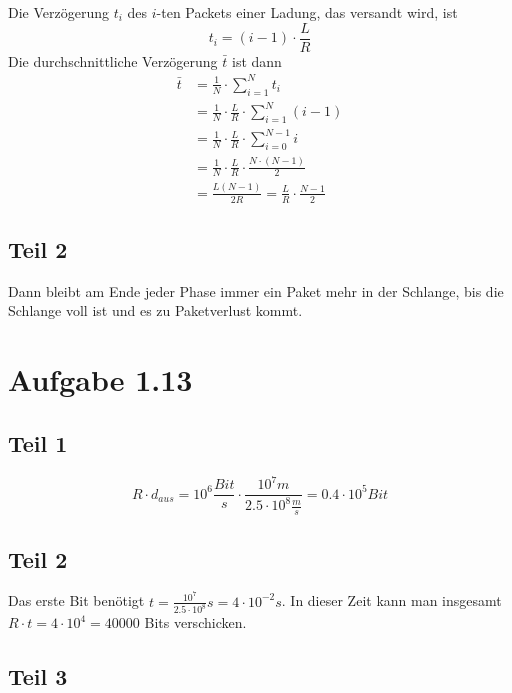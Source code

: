\documentclass[10pt,a4paper]{article}
\begin{document}
Die Verzögerung $t_{i}$ des $i$-ten Packets einer Ladung, das versandt wird, ist
\begin{equation}
  t_{i} = (i - 1) \cdot \frac{L}{R}
\end{equation}
Die durchschnittliche Verzögerung $\bar{t}$ ist dann
\begin{align*}
  \bar{t} & = \frac{1}{N} \cdot \sum_{i = 1}^{N} t_{i}\\
  & = \frac{1}{N} \cdot \frac{L}{R} \cdot \sum_{i = 1}^{N} (i - 1)\\
  & = \frac{1}{N} \cdot \frac{L}{R} \cdot \sum_{i = 0}^{N - 1} i\\
  & = \frac{1}{N} \cdot \frac{L}{R} \cdot \frac{N \cdot (N - 1)}{2}\\
  & = \frac{L(N - 1)}{2R} = \frac{L}{R} \cdot \frac{N - 1}{2}
\end{align*}

\subsection{Teil 2}

Dann bleibt am Ende jeder Phase immer ein Paket mehr in der Schlange, bis die
Schlange voll ist und es zu Paketverlust kommt.

\section{Aufgabe 1.13}

\subsection{Teil 1}

\begin{equation}
  R \cdot d_{aus} = 10^{6} \frac{Bit}{s} \cdot \frac{10^{7}m}{2.5 \cdot 10^{8} \frac{m}{s}} = 0.4 \cdot 10^{5} Bit
\end{equation}

\subsection{Teil 2}

Das erste Bit benötigt $t = \frac{10^{7}}{2.5 \cdot 10^{8}}s = 4 \cdot
10^{-2}s$. In dieser Zeit kann man insgesamt $R \cdot t = 4 \cdot 10^{4} =
40000$ Bits verschicken.

\subsection{Teil 3}
\end{document}
